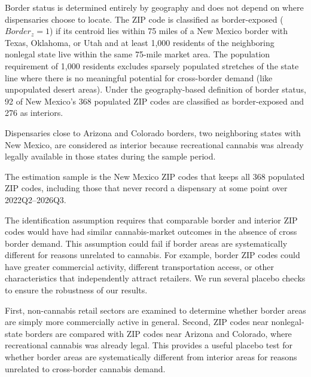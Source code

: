 \documentclass[12pt]{article}
\begin{document}
Border status is determined entirely by geography and does not depend on where dispensaries choose to locate. The ZIP code is classified as border-exposed ($Border_z=1$) if its centroid lies within 75 miles of a New Mexico border with Texas, Oklahoma, or Utah and at least 1,000 residents of the neighboring nonlegal state live within the same 75-mile market area. The population requirement of 1,000 residents excludes sparsely populated stretches of the state line where there is no meaningful potential for cross-border demand (like unpopulated desert areas).
Under the geography-based definition of border status, 92 of New Mexico's 368 populated ZIP codes are classified as border-exposed and 276 as interiors.

Dispensaries close to Arizona and Colorado borders, two neighboring states with New Mexico, are considered as interior because recreational cannabis was already legally available in those states during the sample period.

The estimation sample is the New Mexico ZIP codes that keeps all 368 populated ZIP codes, including those that never record a dispensary at some point over 2022Q2--2026Q3. 

The identification assumption requires that comparable border and interior ZIP codes would have had similar cannabis-market outcomes in the absence of cross border demand. This assumption could fail if border areas are systematically different for reasons unrelated to cannabis. For example, border ZIP codes could have greater commercial activity, different transportation access, or other characteristics that independently attract retailers. We run several placebo checks to ensure the robustness of our results.

First, non-cannabis retail sectors are examined to determine whether border areas are simply more commercially active in general. Second, ZIP codes near nonlegal-state borders are compared with ZIP codes near Arizona and Colorado, where recreational cannabis was already legal. This provides a useful placebo test for whether border areas are systematically different from interior areas for reasons unrelated to cross-border cannabis demand.
\end{document}
